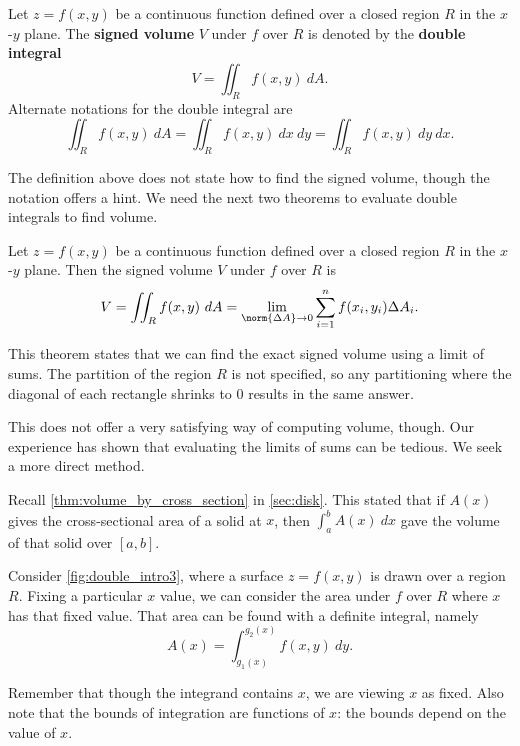 \begin{definition}\label{def:double_int}
Let $z=f(x,y)$ be a continuous function defined over a closed region $R$ in the $x$-$y$ plane. The \textbf{signed volume} $V$ under $f$ over $R$ is denoted by the \textbf{double integral}
\[V = \iint_R f(x,y)\ dA.\]
Alternate notations for the double integral are
\[\iint_R f(x,y)\ dA=\iint_R f(x,y)\ dx\ dy=\iint_R f(x,y)\ dy\ dx.\]
\end{definition}

The definition above does not state how to find the signed volume, though the notation offers a hint. We need the next two theorems to evaluate double integrals to find volume.

\begin{theorem}\label{thm:double_int}
Let $z=f(x,y)$ be a continuous function defined over a closed region $R$ in the $x$-$y$ plane. Then the signed volume $V$ under $f$ over $R$ is
\[V = \iint_R f(x,y)\ dA = \lim_{\norm{\Delta A}\to 0}\sum_{i=1}^n f(x_i,y_i)\Delta A_i.\]
\end{theorem}

This theorem states that we can find the exact signed volume using a limit of sums. The partition of the region $R$ is not specified, so any partitioning where the diagonal of each rectangle shrinks to 0 results in the same answer. 

This does not offer a very satisfying way of computing volume, though. Our experience has shown that evaluating the limits of sums can be tedious. We seek a more direct method.

Recall \autoref{thm:volume_by_cross_section} in \autoref{sec:disk}. This stated that if $A(x)$ gives the cross-sectional area of a solid at $x$, then $\int_a^b A(x)\ dx$ gave the volume of that solid over $[a,b]$. 

Consider \autoref{fig:double_intro3}, where a surface $z=f(x,y)$ is drawn over a region $R$. Fixing a particular $x$ value, we can consider the area under $f$ over $R$ where $x$ has that fixed value. That area can be found with a definite integral, namely
\[ A(x)=\int_{g_1(x)}^{g_2(x)} f(x,y)\ dy.\]

Remember that though the integrand contains $x$, we are viewing $x$ as fixed. Also note that the bounds of integration are functions of $x$: the bounds depend on the value of $x$. 


